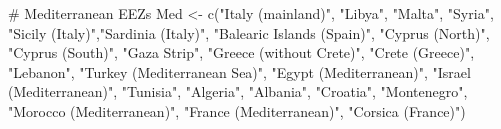 \documentclass[
  letterpaper,
  oneside,
  open=any]{scrbook}
\newenvironment{Shaded}{\begin{snugshade}}{\end{snugshade}}
\newcommand{\CommentTok}[1]{\textcolor[rgb]{0.37,0.37,0.37}{#1}}
\newcommand{\FunctionTok}[1]{\textcolor[rgb]{0.28,0.35,0.67}{#1}}
\newcommand{\NormalTok}[1]{\textcolor[rgb]{0.00,0.23,0.31}{#1}}
\newcommand{\OtherTok}[1]{\textcolor[rgb]{0.00,0.23,0.31}{#1}}
\newcommand{\StringTok}[1]{\textcolor[rgb]{0.13,0.47,0.30}{#1}}
\begin{document}
\begin{Shaded}
\begin{Highlighting}[]
\CommentTok{\# Mediterranean EEZs}
\NormalTok{Med }\OtherTok{\textless{}{-}} \FunctionTok{c}\NormalTok{(}\StringTok{"Italy (mainland)"}\NormalTok{, }\StringTok{"Libya"}\NormalTok{, }\StringTok{"Malta"}\NormalTok{, }\StringTok{"Syria"}\NormalTok{, }\StringTok{"Sicily (Italy)"}\NormalTok{,}\StringTok{"Sardinia (Italy)"}\NormalTok{, }
         \StringTok{"Balearic Islands (Spain)"}\NormalTok{, }\StringTok{"Cyprus (North)"}\NormalTok{, }\StringTok{"Cyprus (South)"}\NormalTok{, }
         \StringTok{"Gaza Strip"}\NormalTok{, }\StringTok{"Greece (without Crete)"}\NormalTok{, }\StringTok{"Crete (Greece)"}\NormalTok{, }\StringTok{"Lebanon"}\NormalTok{, }
         \StringTok{"Turkey (Mediterranean Sea)"}\NormalTok{, }\StringTok{"Egypt (Mediterranean)"}\NormalTok{, }\StringTok{"Israel (Mediterranean)"}\NormalTok{, }\StringTok{"Tunisia"}\NormalTok{, }
         \StringTok{"Algeria"}\NormalTok{, }\StringTok{"Albania"}\NormalTok{, }\StringTok{"Croatia"}\NormalTok{, }\StringTok{"Montenegro"}\NormalTok{, }\StringTok{"Morocco (Mediterranean)"}\NormalTok{, }
         \StringTok{"France (Mediterranean)"}\NormalTok{, }\StringTok{"Corsica (France)"}\NormalTok{)}


\end{Highlighting}
\end{Shaded}
\end{document}

